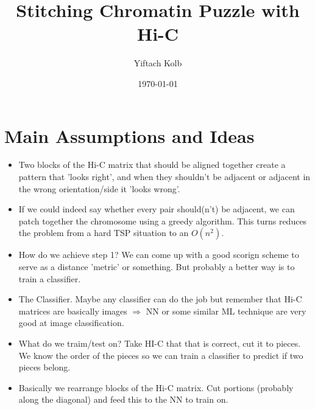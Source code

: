 \documentclass[10pt]{article}
\theoremstyle{definition}
\theoremstyle{remark}
\theoremstyle{plain}
\begin{document}
\renewcommand{\thesubsection}{\thesection.\alph{subsection}}\renewcommand{\thesubsection}{\thesection.\alph{subsection}}


\begin{titlepage}
    \title{Stitching Chromatin Puzzle with Hi-C}
    \author{Yiftach Kolb}
    \date{\today}
\end{titlepage}

\maketitle

\section{Main Assumptions and Ideas}

\begin{itemize}
\item{} Two blocks of the Hi-C matrix that should be aligned
together create a pattern that 'looks right', and when they shouldn't
be adjacent or adjacent in the wrong orientation/side it 'looks
wrong'.

\item{} If we could indeed say whether every pair should(n't) be
adjacent, we can patch together the chromosome using a greedy
algorithm. This turns reduces the problem from a hard TSP situation
to an $O(n^2)$.

\item{} How do we achieve step 1? We can come up with a good 
scorign scheme to serve as a distance 'metric' or something. But
probably a better way is to train a classifier.

\item{} The Classifier. Maybe any classifier can do the job but
remember that Hi-C matrices are basically images $\Rightarrow$ NN or
some similar ML technique are very good at image classification.

\item{} What do we traim/test on? Take HI-C that that is correct,
cut it to pieces. We know the order of the pieces so we can train a
classifier to predict if two pieces belong.

\item{} Basically we rearrange blocks of the Hi-C matrix. Cut
portions (probably along the diagonal) and feed this to the NN to
train on.


\end{itemize}
\end{document}
